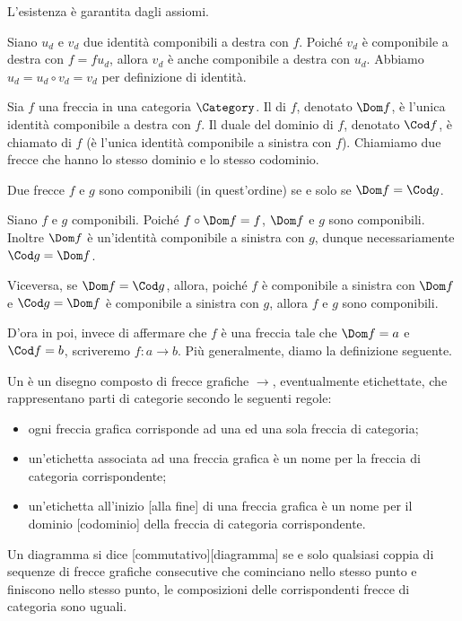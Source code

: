 \Proof L'esistenza \`e garantita dagli assiomi.
\par Siano $u_d$ e $v_d$ due identit\`a componibili a destra con $f$. Poich\'e $v_d$ \`e componibile a destra con $f = f u_d$, allora $v_d$ \`e anche componibile a destra con $u_d$. Abbiamo $u_d = u_d \circ v_d = v_d$ per definizione di identit\`a. \EndProof
\begin{Definition}
	Sia $f$ una freccia in una categoria $\Category$. Il  di $f$, denotato $\Dom f$, \`e l'unica identit\`a componibile a destra con $f$. Il duale del dominio di $f$, denotato $\Cod f$, \`e chiamato  di $f$ (\`e l'unica identit\`a componibile a sinistra con $f$). Chiamiamo  due frecce che hanno lo stesso dominio e lo stesso codominio.
\end{Definition}
\begin{Theorem}
	Due frecce $f$ e $g$ sono componibili (in quest'ordine) se e solo se $\Dom f = \Cod g$.
\end{Theorem}
\Proof Siano $f$ e $g$ componibili. Poich\'e $f \circ \Dom f = f$, $\Dom f$ e $g$ sono componibili. Inoltre $\Dom f$ \`e un'identit\`a componibile a sinistra con $g$, dunque necessariamente $\Cod g = \Dom f$.
\par Viceversa, se $\Dom f = \Cod g$, allora, poich\'e $f$ \`e componibile a sinistra con $\Dom f$ e $\Cod g = \Dom f$ \`e componibile a sinistra con $g$, allora $f$ e $g$ sono componibili. \EndProof
\par D'ora in poi, invece di affermare che $f$ \`e una freccia tale che $\Dom f = a$ e $\Cod f = b$, scriveremo $f: a \rightarrow b$. Pi\`u generalmente, diamo la definizione seguente.
\begin{Definition}
	Un  \`e un disegno composto di frecce grafiche $\rightarrow$, eventualmente etichettate, che rappresentano parti di categorie secondo le seguenti regole:
	\begin{itemize}
		\item ogni freccia grafica corrisponde ad una ed una sola freccia di categoria;
		\item un'etichetta associata ad una freccia grafica \`e un nome per la freccia di categoria corrispondente;
		\item un'etichetta all'inizio [alla fine] di una freccia grafica \`e un nome per il dominio [codominio] della freccia di categoria corrispondente.
	\end{itemize}
	Un diagramma si dice [commutativo][diagramma] se e solo qualsiasi coppia di sequenze di frecce grafiche consecutive che cominciano nello stesso punto e finiscono nello stesso punto, le composizioni delle corrispondenti frecce di categoria sono uguali.
\end{Definition}
